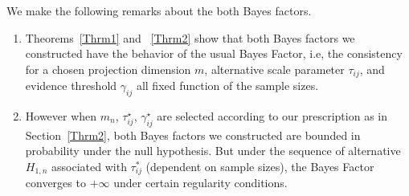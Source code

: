 \documentclass[times,sort&compress,3p]{elsarticle}
\theoremstyle{plain}%
\theoremstyle{definition}
\def\refhg{\hangindent=20pt\hangafter=1}
\def\refmark{\par\vskip 2mm\noindent\refhg}
\def\refhg{\hangindent=20pt\hangafter=1}
\def\refmark{\par\vskip 2mm\noindent\refhg}
\def\refhg{\hangindent=20pt\hangafter=1}
\def\refmark{\par\vskip 2mm\noindent\refhg}
\def\refhg{\hangindent=20pt\hangafter=1}
\def\refmark{\par\vskip 2mm\noindent\refhg}
\begin{document}
{\color{red}
\refmark{\bf Remarks:}
We make the following remarks about the both Bayes factors. 
\begin{enumerate}
    \item Theorems~\ref{Thrm1} and ~\ref{Thrm2} show that both Bayes factors we constructed have the behavior of the usual Bayes Factor, i.e, the consistency for a chosen projection dimension $m$, alternative scale parameter $\tau_{ij}$, and evidence threshold $\gamma_{ij}$ all fixed function of the sample sizes. 
    \item However when $m_n$, $\tau^{\star}_{ij}$, $\gamma^{\star}_{ij}$ are selected according to our prescription as in Section~\ref{Thrm2}, both Bayes factors we constructed are bounded in probability under the null hypothesis. But under the sequence of alternative $H_{1,n}$ associated with $\tau^{*}_{ij}$ (dependent on sample sizes), the Bayes Factor converges to $+\infty$ under certain regularity conditions.
\end{enumerate}
}
\end{document}
